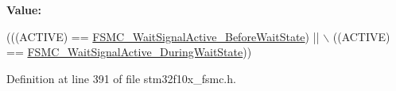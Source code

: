 {\bfseries Value\+:}
\begin{DoxyCode}
(((ACTIVE) == \hyperlink{group___f_s_m_c___wait___timing_ga62c6855a7cc65b20024085f09cdc65e8}{FSMC\_WaitSignalActive\_BeforeWaitState}) || \(\backslash\)
                                            ((ACTIVE) == 
      \hyperlink{group___f_s_m_c___wait___timing_gae905fc59e5d99091d132d7c221c8b6d4}{FSMC\_WaitSignalActive\_DuringWaitState}))
\end{DoxyCode}


Definition at line 391 of file stm32f10x\+\_\+fsmc.\+h.

